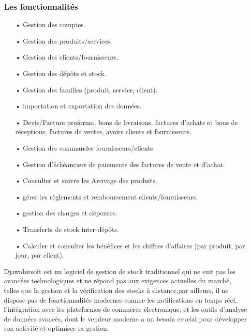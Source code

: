 \documentclass[edit,12pt,a4paper,ChapStyle,oneside,doubleinterligne]{report}
\begin{document}
\subsubsection{Les fonctionnalités}
\begin{itemize}
    \item [•] Gestion des comptes. 
    \item [•] Gestion des produits/services.
    \item [•] Gestion des clients/fournisseurs.
    \item [•] Gestion des dépôts et stock.
    \item [•] Gestion des familles (produit, service, client).
    \item [•] importation et exportation des données.
    \item [•] Devis/Facture proforma, bons de livraisons, factures d'achats et bons de réceptions, factures de ventes, avoirs clients et fournisseurs.
    \item [•] Gestion des commandes fournisseurs/clients.
    \item [•] Gestion d'échéanciers de paiements des factures de vente et d'achat.
    \item [•] Consulter et suivre les Arrivage des produits.
    \item [•] gérer les règlements et remboursement clients/fournisseurs.
    \item [•] gestion des charges et dépenses.
    \item [•] Transferts de stock inter-dépôts.
    \item [•] Calculer et consulter les bénéfices et les chiffres d'affaires (par produit, par jour, par client).
\end{itemize}
Djawahirsoft est un logiciel de gestion de stock traditionnel qui ne suit pas les avancées technologiques et ne répond pas aux exigences actuelles du marché, telles que la gestion et la vérification des stocks à distance,par ailleurs, il ne dispose pas de fonctionnalités modernes comme les notifications en temps réel, l'intégration avec les plateformes de commerce électronique, et les outils d'analyse de données avancés, dont le vendeur moderne a un besoin crucial pour développer son activité et optimiser sa gestion.
\end{document}
